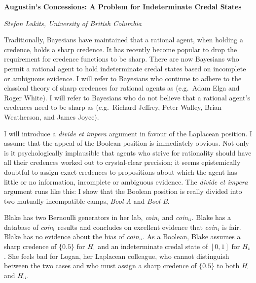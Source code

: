 \documentclass[11pt]{article}
\newcommand{\anderson}[0]{\textit{Bool-A}}
\newcommand{\augustin}[0]{\textit{Bool-B}}
\begin{document}





\textbf{Augustin's Concessions: A Problem for Indeterminate Credal States}

\emph{Stefan Lukits, University of British Columbia}

Traditionally, Bayesians have maintained that a rational agent, when
holding a credence, holds a sharp credence. It has recently become
popular to drop the requirement for credence functions to be sharp.
There are now Bayesians who permit a rational agent to hold
indeterminate credal states based on incomplete or ambiguous evidence.
I will refer to Bayesians who continue to adhere to the classical
theory of sharp credences for rational agents as 
(e.g.\ Adam Elga and Roger White). I will refer to Bayesians who do
not believe that a rational agent's credences need to be sharp as
 (e.g.\ Richard Jeffrey, Peter Walley, Brian
Weatherson, and James Joyce).

I will introduce a \emph{divide et impera} argument in favour of the
Laplacean position. I assume that the appeal of the Boolean position
is immediately obvious. Not only is it psychologically implausible
that agents who strive for rationality should have all their credences
worked out to crystal-clear precision; it seems epistemically doubtful
to assign exact credences to propositions about which the agent has
little or no information, incomplete or ambiguous evidence. The
\emph{divide et impera} argument runs like this: I show that the
Boolean position is really divided into two mutually incompatible
camps, {\anderson} and {\augustin}.

\begin{quotex}
  \label{ex:range} Blake has two Bernoulli generators in
  her lab, \textit{coin}$_{\mbox{\tiny{i}}}$ and
  \textit{coin}$_{\mbox{\tiny{ii}}}$. Blake has a database of
  \textit{coin}$_{\mbox{\tiny{i}}}$ results and concludes on excellent
  evidence that \textit{coin}$_{\mbox{\tiny{i}}}$ is fair. Blake has no
  evidence about the bias of \textit{coin}$_{\mbox{\tiny{ii}}}$. As a
  Boolean, Blake assumes a sharp credence of $\{0.5\}$ for
  $H_{\mbox{\tiny{i}}}$ and an indeterminate credal state of $[0,1]$
  for $H_{\mbox{\tiny{ii}}}$. She feels bad for Logan, her Laplacean
  colleague, who cannot distinguish between the two cases and who must
  assign a sharp credence of $\{0.5\}$ to both $H_{\mbox{\tiny{i}}}$
  and $H_{\mbox{\tiny{ii}}}$.
\end{quotex}
\end{document}
